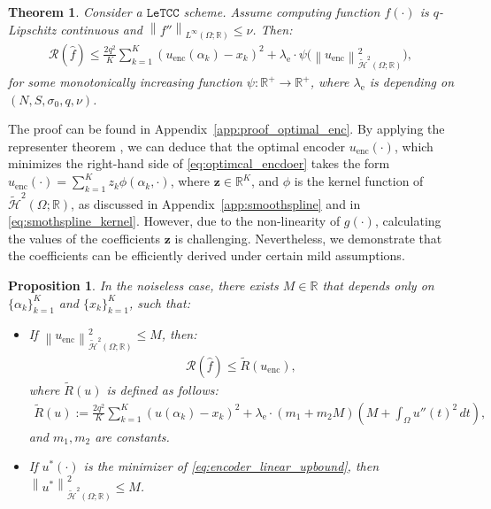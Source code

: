 \documentclass{article}
\newtheorem{theorem}{Theorem}
\newtheorem{proposition}{Proposition}
\def\encs{u_\textrm{enc}}
\def\enclamb{\lambda_\textrm{e}}
\def\nprcc{\texttt{LeTCC}}
\newcommand{\norm}[1]{\left\lVert#1\right\rVert}
\newcommand{\lp}[1]{{L}^{#1}\left(\Omega; \mathbb{R}\right)}
\newcommand{\hil}[1]{\mathcal{H}^{#1}\left(\Omega;\mathbb{R}\right)}
\newcommand{\hiltilde}[1]{\widetilde{\mathcal{H}}^{#1}\left(\Omega;\mathbb{R}\right)}
\newcommand{\moh}[1]{{\color{red}#1}}
\begin{document}
\begin{theorem}\label{th:optimcal_encdoer} Consider a $\nprcc$ scheme. Assume computing function $f(\cdot)$ is $q$-Lipschitz continuous and
$\norm{f''}_{\lp{\infty}} \leqslant \nu$. Then:
\begin{align}\label{eq:optimcal_encdoer}
    \mathcal{R}(\hat{f}) \leqslant \frac{2q^2}{K} \sum^K_{k=1} (\encs(\alpha_k) - x_k)^2 + \enclamb \cdot   \psi\big(\norm{\encs}^2_{\hiltilde{2}}\big),
\end{align}
for some monotonically increasing function $\psi:\mathbb{R}^{+} \to \mathbb{R}^+$, where 
$\enclamb$ is depending on $(N, S, \sigma_0, q, \nu)$.
\end{theorem}
The proof can be found in Appendix~\ref{app:proof_optimal_enc}. By applying the representer theorem \citep{scholkopf2001generalized}, we can deduce that the optimal encoder $\encs(\cdot)$, which minimizes the right-hand side of \eqref{eq:optimcal_encdoer} takes the form $\encs (\cdot)= \sum^K_{k=1} z_k\phi(\alpha_k, \cdot)$, where $\mathbf{z} \in \mathbb{R}^K$, and $\phi$ is the kernel function of $\hiltilde{2}$, as discussed in Appendix~\ref{app:smoothspline} and in \eqref{eq:smothspline_kernel}. However, due to the non-linearity of $g(\cdot)$, calculating the values of the coefficients $\mathbf{z}$ is challenging. Nevertheless, we demonstrate that the coefficients can be efficiently derived under certain mild assumptions.
\begin{proposition}\label{prop:encoder_optimal} 
In the noiseless case, there exists $M \in \mathbb{R}$ that depends only on $\{\alpha_k\}_{k=1}^K$ and $\{x_k\}_{k=1}^K$, such that:
\begin{itemize}
\item[(i)] If $\norm{\encs}^2_{\hiltilde{2}} \leqslant M$, then:
    \begin{align}
        \mathcal{R}(\hat{f}) \leqslant \widetilde{R}(\encs),
    \end{align}
    where $\widetilde{R}(u)$ is defined as follows:
\begin{align}\label{eq:encoder_linear_upbound}
    \widetilde{R}(u) := \frac{2q^2}{K} \sum^K_{k=1} (u(\alpha_k) - x_k)^2 + \enclamb \cdot (m_1 + m_2M) \left(M + \int_\Omega u''(t)^2\,dt\right),
\end{align}
and $m_1, m_2$ are constants.

\item[(ii)] If  $u^*(\cdot)$ is the  minimizer of \eqref{eq:encoder_linear_upbound}, then $\norm{u^*}^2_{\hiltilde{2}} \leqslant M$.
  \end{itemize}
\end{proposition}
\end{document}
